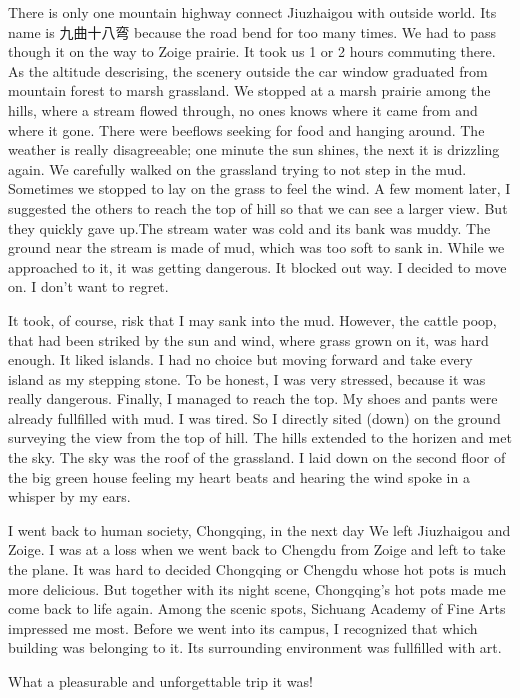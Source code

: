 \documentclass[UTF8]{article}
\begin{document}
There is only one mountain highway connect Jiuzhaigou with outside  world. Its name is 九曲十八弯 because the road bend for too many times.
We had to pass though it on the way to Zoige prairie. It took us 1 or 2  hours commuting there. As the altitude descrising, the scenery outside the car window graduated from mountain forest to marsh grassland.  We stopped at a marsh prairie among the hills, where a stream flowed through, no ones knows where it came from and where it gone. There were beeflows seeking for food and hanging around. The weather is really disagreeable; one minute the sun shines, the next it is drizzling again. We carefully walked on the grassland trying to not step in the mud. Sometimes we stopped to lay on the grass to feel the wind. A few moment later, I suggested the others to reach the top of hill so that we can see a larger view. But they quickly gave up.The stream water was cold and its bank was muddy. The ground near the stream is made of mud, which was too soft to sank in. While we approached to it,  it was getting dangerous. It blocked out way. I decided to move on. I don't want to regret.

It took, of course, risk that I may sank into the mud. However, the cattle poop, that had been striked by the sun and wind, where grass grown on it, was hard enough. It liked islands. I had no choice but moving forward and take every island as my stepping stone. To be honest, I was very stressed, because it was really dangerous. Finally, I managed to reach the top. My shoes and pants were already fullfilled with mud. I was tired. So I directly  sited (down) on the ground surveying the view from the top of hill. The hills extended to the horizen and met the sky. The sky was the roof of the grassland. I laid down on the second floor of the big green house feeling my heart beats and hearing the wind spoke in a whisper by my ears. 

I went back to human society, Chongqing, in the next day We left  Jiuzhaigou and Zoige. I was at a loss when we went back to Chengdu from Zoige and left to take the plane. It was hard to decided Chongqing or Chengdu whose hot pots is much more delicious. But together with its night scene, Chongqing's hot pots made me come back to life again. Among the scenic spots,  Sichuang Academy of Fine Arts impressed me most. Before we went into its campus, I recognized that which building was belonging to it. Its surrounding environment was fullfilled with art. 

What a pleasurable and unforgettable trip it was!
\end{document}
